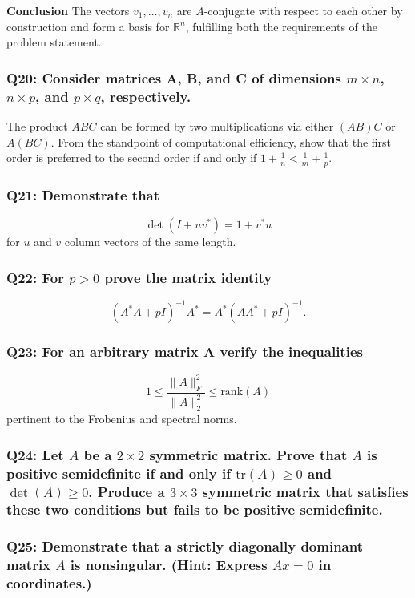 \documentclass[8pt]{article}
\begin{document}
\textbf{Conclusion}
The vectors \(v_1, \ldots, v_n\) are \(A\)-conjugate with respect to each other by construction and form a basis for \(\mathbb{R}^n\), fulfilling both the requirements of the problem statement.

\subsubsection*{Q20: Consider matrices A, B, and C of dimensions \(m \times n\), \(n \times p\), and \(p \times q\), respectively.}
The product \(ABC\) can be formed by two multiplications via either \((AB)C\) or \(A(BC)\). From the standpoint of computational efficiency, show that the first order is preferred to the second order if and only if \(1 + \frac{1}{n} < \frac{1}{m} + \frac{1}{p}\).

\subsubsection*{Q21: Demonstrate that}
\[
\det(I + uv^*) = 1 + v^*u
\]
for \(u\) and \(v\) column vectors of the same length.

\subsubsection*{Q22: For \(p > 0\) prove the matrix identity}
\[
(A^*A + pI)^{-1} A^* = A^*(AA^* + pI)^{-1}.
\]

\subsubsection*{Q23: For an arbitrary matrix A verify the inequalities}
\[
1 \leq \frac{\|A\|_F^2}{\|A\|_2^2} \leq \text{rank}(A)
\]
pertinent to the Frobenius and spectral norms.

\subsubsection*{Q24: Let \(A\) be a \(2 \times 2\) symmetric matrix. Prove that \(A\) is positive semidefinite if and only if \(\text{tr}(A) \geq 0\) and \(\det(A) \geq 0\). Produce a \(3 \times 3\) symmetric matrix that satisfies these two conditions but fails to be positive semidefinite.}

\subsubsection*{Q25: Demonstrate that a strictly diagonally dominant matrix \(A\) is nonsingular. (Hint: Express \(Ax = 0\) in coordinates.)}
\end{document}
